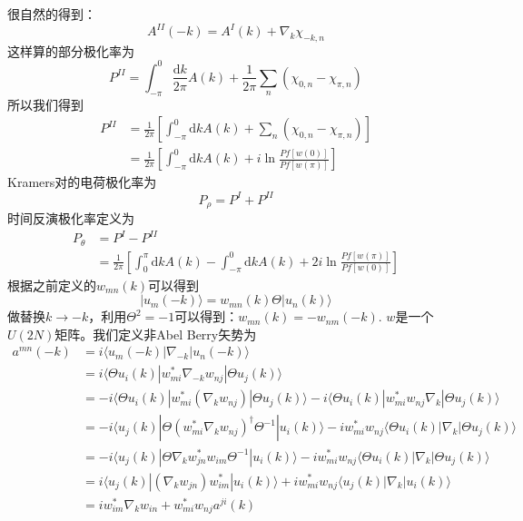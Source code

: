 \documentclass{article}
\numberwithin{equation}{subsection}
\begin{document}
很自然的得到：
\begin{equation}
    A^{II}(-k)=A^{I}(k)+\nabla_k\chi_{-k,n}
\end{equation}
这样算的部分极化率为
\begin{equation}
    P^{II}=\int_{-\pi}^{0}\frac{\mathrm{d}k}{2\pi}A(k)+\frac{1}{2\pi}\sum_n(\chi_{0,n}-\chi_{\pi,n})
\end{equation}
所以我们得到
\begin{equation}
    \begin{split}
        P^{II}&=\frac{1}{2\pi}\left[\int_{-\pi}^{0}\mathrm{d}kA(k)+\sum_{n}(\chi_{0,n}-\chi_{\pi,n})\right]\\
        &=\frac{1}{2\pi}\left[\int_{-\pi}^{0}\mathrm{d}kA(k)+i\ln\frac{Pf[w(0)]}{Pf[w(\pi)]}\right]
    \end{split}
\end{equation}
Kramers对的电荷极化率为
\begin{equation}
    P_\rho=P^I+P^{II}
\end{equation}
时间反演极化率定义为
\begin{equation}
    \begin{split}
        P_\theta&=P^I-P^{II}\\
        &=\frac{1}{2\pi}\left[\int_0^{\pi}\mathrm{d}kA(k)-\int_{-\pi}^{0}\mathrm{d}kA(k)+2i\ln\frac{Pf[w(\pi)]}{Pf[w(0)]}\right]
    \end{split}
\end{equation}
根据之前定义的$w_{mn}(k)$可以得到
\begin{equation}
    |u_{m}(-k)\rangle=w_{mn}(k)\Theta|u_n(k)\rangle
\end{equation}
做替换$k\rightarrow-k$，利用$\Theta^2=-1$可以得到：$w_{mn}(k)=-w_{nm}(-k)$. $w$是一个$U(2N)$矩阵。我们定义非Abel Berry矢势为
\begin{equation}
    \begin{split}
        a^{mn}(-k)&=i\langle u_m(-k)|\nabla_{-k}|u_n(-k)\rangle\\
        &=i\langle\Theta u_i(k)|w_{mi}^*\nabla_{-k}w_{nj}|\Theta u_j(k)\rangle\\
        &=-i\langle\Theta u_i(k)|w_{mi}^*(\nabla_k w_{nj})|\Theta u_j(k)\rangle-i\langle\Theta u_i(k)|w_{mi}^*w_{nj}\nabla_k|\Theta u_j(k)\rangle\\
        &=-i\langle u_j(k)|\Theta(w_{mi}^*\nabla_kw_{nj})^\dagger\Theta^{-1}|u_i(k)\rangle-iw_{mi}^*w_{nj}\langle\Theta u_i(k)|\nabla_k|\Theta u_j(k)\rangle\\
        &=-i\langle u_j(k)|\Theta\nabla_k w_{jn}^*w_{im}\Theta^{-1}|u_i(k)\rangle-iw_{mi}^*w_{nj}\langle\Theta u_i(k)|\nabla_k|\Theta u_j(k)\rangle\\
        &=i\langle u_j(k)|(\nabla_k w_{jn})w_{im}^*|u_i(k)\rangle+iw_{mi}^*w_{nj}\langle u_j(k)|\nabla_k|u_i(k)\rangle\\
        &=iw_{im}^*\nabla_k w_{in}+w_{mi}^*w_{nj}a^{ji}(k)
    \end{split}
\end{equation}
\end{document}
